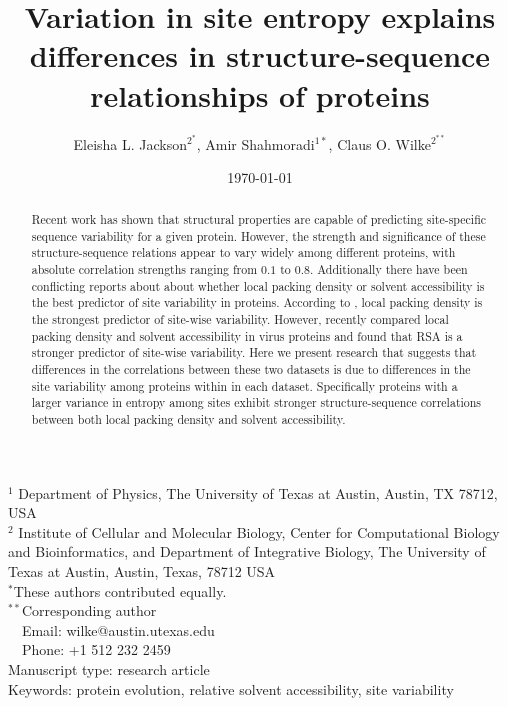 \documentclass[12pt]{article}
\title{Variation in site entropy explains differences in structure-sequence relationships of proteins}
\author{Eleisha L. Jackson$^{2^*}$, Amir Shahmoradi$^{1*}$, Claus O. Wilke$^{2^{**}}$}
\begin{document}
\date{\today}
\maketitle


\noindent
$^1$ Department of Physics, The University of Texas at Austin, Austin, TX 78712, USA \\
$^2$ Institute of Cellular and Molecular Biology, Center for Computational Biology and Bioinformatics, and Department of Integrative Biology, The University of Texas at Austin, Austin, Texas, 78712 USA\\

\noindent $^{*}$These authors contributed equally. \\

\bigskip
\noindent
$^{**}$Corresponding author\\
$\phantom{^{** }}$Email: wilke@austin.utexas.edu\\
$\phantom{^{**}}$Phone: +1 512 232 2459\\

\bigskip
\noindent
Manuscript type: research article\\
\bigskip
\noindent  Keywords: protein evolution, relative solvent accessibility, site variability


\begin{abstract}
Recent work has shown that structural properties are capable of predicting site-specific sequence variability for a given protein. However, the strength and significance of these structure-sequence relations appear to vary widely among different proteins, with absolute correlation strengths ranging from $0.1$ to $0.8$.  Additionally there have been conflicting reports about about whether local packing density or solvent accessibility is the best predictor of site variability in proteins. According to \cite{Yehetal2014}, local packing density is the strongest predictor of site-wise variability. However, recently \cite{Shahmoradietal2014} compared local packing density and solvent accessibility in virus proteins and found that RSA is a stronger predictor of site-wise variability. Here we present research that suggests that differences in the correlations between these two datasets is due to differences in the site variability among proteins within in each dataset. Specifically proteins with a larger variance in entropy among sites exhibit stronger structure-sequence correlations between both local packing density and solvent accessibility. 
\end{abstract}
\vfill
\vfill
\def\thefootnote{\fnsymbol{footnote}}
\setcounter{footnote}{0}
\end{document}
